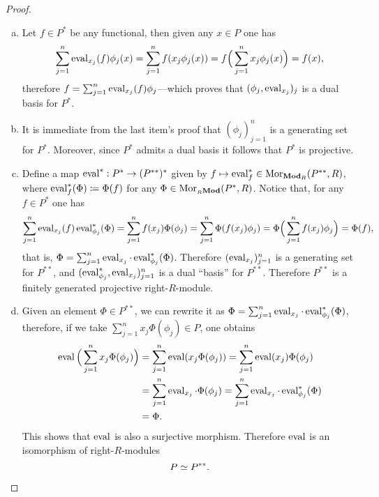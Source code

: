 \begin{proof}
\begin{enumerate}[(a)]\setlength\itemsep{0em}
\item Let \(f \in P^{*}\) be any functional, then given any \(x \in P\) one has
  \[
  \sum_{j=1}^n \operatorname{eval}_{x_j}(f) \phi_j(x)
  = \sum_{j=1}^{n} f(x_j \phi_j(x))
  = f\Big( \sum_{j=1}^{n} x_j \phi_j(x) \Big)
  = f(x),
  \]
  therefore \(f = \sum_{j=1}^n \operatorname{eval}_{x_j}(f) \phi_j\)---which proves that
  \((\phi_j, \operatorname{eval}_{x_j})_j\) is a dual basis for \(P^{*}\).

\item It is immediate from the last item's proof that \((\phi_j)_{j=1}^n\) is a
  generating set for \(P^{*}\). Moreover, since \(P^{*}\) admits a dual basis it
  follows that \(P^{*}\) is projective.

\item Define a map \(\operatorname{eval}^{*}: P^{*} \to (P^{* *})^{*}\) given by \(f \mapsto
  \operatorname{eval}_f^{*} \in \operatorname{Mor}_{{\textbf{Mod}_{R}}}(P^{* *}, R)\), where \(\operatorname{eval}_f^{*}(\Phi)
  \coloneq \Phi(f)\) for any \(\Phi \in \operatorname{Mor}_{{{}_{R}\textbf{Mod}}}(P^{*}, R)\). Notice
  that, for any \(f \in P^{*}\) one has
  \[
  \sum_{j=1}^n \operatorname{eval}_{x_j}(f) \operatorname{eval}_{\phi_j}^{*}(\Phi)
  = \sum_{j=1}^n f(x_j) \Phi(\phi_j)
  = \sum_{j=1}^n \Phi(f(x_j) \phi_j)
  = \Phi\Big( \sum_{j=1}^n f(x_j) \phi_j \Big)
  = \Phi(f),
  \]
  that is, \(\Phi = \sum_{j=1}^n \operatorname{eval}_{x_j} \cdot \operatorname{eval}_{\phi_j}^{*}
  (\Phi)\). Therefore \((\operatorname{eval}_{x_j})_{j=1}^n\) is a generating set for
  \(P^{* *}\), and \((\operatorname{eval}_{\phi_j}^{*}, \operatorname{eval}_{x_j})_{j=1}^n\) is a dual
  ``basis'' for \(P^{* *}\). Therefore \(P^{* *}\) is a finitely generated
  projective right-\(R\)-module.

\item Given an element \(\Phi \in P^{* *}\), we can rewrite it as
  \(\Phi = \sum_{j=1}^n \operatorname{eval}_{x_j} \cdot \operatorname{eval}_{\phi_j}^{*}(\Phi)\), therefore,
  if we take \(\sum_{j=1}^n x_j \Phi(\phi_j) \in P\), one obtains
  \begin{align*}
  \operatorname{eval}\Big(\sum_{j=1}^n x_j \Phi(\phi_j)\Big)
  &= \sum_{j=1}^n \operatorname{eval}(x_j \Phi(\phi_j))
  = \sum_{j=1}^n \operatorname{eval}(x_j) \Phi(\phi_j) \\
  &= \sum_{j=1}^n \operatorname{eval}_{x_j} \cdot \Phi(\phi_j)
  = \sum_{j=1}^n \operatorname{eval}_{x_j} \cdot \operatorname{eval}_{\phi_j}^{*}(\Phi) \\
  &= \Phi.
  \end{align*}
  This shows that \(\operatorname{eval}\) is also a surjective morphism. Therefore \(\operatorname{eval}\)
  is an isomorphism of right-\(R\)-modules
  \[
  P \simeq P^{* *}.
  \]
\end{enumerate}
\end{proof}

